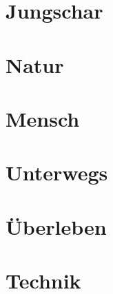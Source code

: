 



	
	\chapter{Jungschar}
	
	
	
	
	
	\chapter{Natur}
	
	
	
	
	
	\chapter{Mensch}
	
	
	
	
	
	\chapter{Unterwegs}
	
	
	
	
	
	\chapter{Überleben}
	
	
	
	
	
	\chapter{Technik}
	
	
	
	
	
